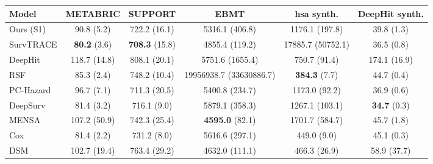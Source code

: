 \begin{tabular}{lccccc}
\toprule
Model & METABRIC & SUPPORT & EBMT & hsa synth. & DeepHit synth. \\
\midrule
Ours (S1) & 90.8 (5.2) & 722.2 (16.1) & 5316.1 (406.8) & 1176.1 (197.8) & 39.8 (1.3) \\
SurvTRACE & \textbf{80.2} (3.6) & \textbf{708.3} (15.8) & 4855.4 (119.2) & 17885.7 (50752.1) & 36.5 (0.8) \\
DeepHit & 118.7 (14.8) & 808.1 (20.1) & 5751.6 (1655.4) & 750.7 (91.4) & 174.1 (16.9) \\
RSF & 85.3 (2.4) & 748.2 (10.4) & 19956938.7 (33630886.7) & \textbf{384.3} (7.7) & 44.7 (0.4) \\
PC-Hazard & 96.7 (7.1) & 711.3 (20.5) & 5400.8 (234.7) & 1173.0 (92.2) & 36.9 (0.6) \\
DeepSurv & 81.4 (3.2) & 716.1 (9.0) & 5879.1 (358.3) & 1267.1 (103.1) & \textbf{34.7} (0.3) \\
MENSA & 107.2 (50.9) & 742.3 (25.4) & \textbf{4595.0} (82.1) & 1701.7 (584.7) & 45.7 (1.8) \\
Cox & 81.4 (2.2) & 731.2 (8.0) & 5616.6 (297.1) & 449.0 (9.0) & 45.1 (0.3) \\
DSM & 102.7 (19.4) & 763.4 (29.2) & 4632.0 (111.1) & 466.3 (26.9) & 58.9 (37.7) \\
\bottomrule
\end{tabular}
